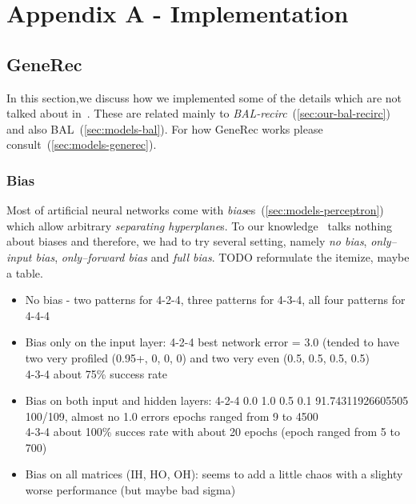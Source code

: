 
\section*{Appendix A - Implementation}
\appendix
{}
\label{sec:appendix-impl} 


\subsection*{GeneRec} 
\label{sec:appendix-impl-generec} 

In this section,we discuss how we implemented some of the details which are not talked about in~\citet{o1996bio}. These are related mainly to \emph{BAL-recirc}~(\ref{sec:our-bal-recirc}) and also BAL~(\ref{sec:models-bal}). For how GeneRec works please consult~(\ref{sec:models-generec}).  

\subsubsection*{Bias} 

Most of artificial neural networks come with \emph{bias}es~(\ref{sec:models-perceptron}) which allow arbitrary \emph{separating hyperplane}s. To our knowledge~\citet{o1996bio} talks nothing about biases and therefore, we had to try several setting, namely \emph{no bias}, \emph{only--input bias}, \emph{only--forward bias} and \emph{full bias}. TODO reformulate the itemize, maybe a table. 

\begin{itemize} 
\item No bias - two patterns for 4-2-4, three patterns for 4-3-4, all four patterns for 4-4-4
\item Bias only on the input layer:  
4-2-4 best network error = 3.0 (tended to have two very profiled (0.95+, 0, 0, 0) and two very even (0.5, 0.5, 0.5, 0.5)  \\
4-3-4 about 75\% success rate 
\item Bias on both input and hidden layers: 
    4-2-4 0.0 1.0 0.5 0.1 91.74311926605505 100/109, almost no 1.0 errors 
          epochs ranged from 9 to 4500 \\ 
    4-3-4 about 100\% succes rate with about 20 epochs (epoch ranged from 5 to 700) 
\item Bias on all matrices (IH, HO, OH): 
    seems to add a little chaos with a slighty worse performance (but maybe bad sigma)

\end{itemize} 

